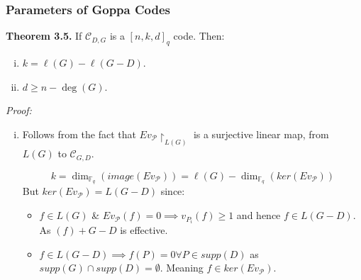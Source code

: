 \documentclass[10pt]{beamer}
\begin{document}
\begin{frame}
  \frametitle{Parameters of Goppa Codes}
  \textbf{Theorem 3.5.} If $\mathcal{C}_{D, G}$ is a $[n, k, d]_q$ code. Then:
  \begin{enumerate}[(i)]
  \pause
    \item $k = \ell(G) - \ell(G - D)$.
  \pause
    \item $d \geq n - \deg(G)$.
  \end{enumerate}
  \pause
  \textit{Proof:}
  \begin{enumerate}[(i)]
    \item Follows from the fact that $Ev_{\mathcal{P}} \restriction_{L(G)}$ is a surjective linear map, from $L(G)$ to $\mathcal{C}_{G, D}$.
      \pause

    \begin{equation*}
      k = \dim_{\mathbb{F}_q}(image(Ev_{\mathcal{P}})) = \ell(G) - \dim_{\mathbb{F}_q}(ker(Ev_{\mathcal{P}}))
    \end{equation*}
    \pause
    But $ker(Ev_{\mathcal{P}}) = L(G - D)$ since:
    \begin{itemize}
    \pause \item $f \in L(G)$ \& $Ev_{\mathcal{P}}(f) = 0 \implies v_{P_i}(f) \geq 1$ and hence $f \in L(G - D)$. As $(f) + G - D$ is effective.
    \pause \item $f \in L(G - D) \implies f(P) = 0 \forall P \in supp(D)$ as $supp(G) \cap supp(D) = \emptyset$. Meaning $f \in ker(Ev_{\mathcal{P}})$.
    \end{itemize}
  \end{enumerate}
\end{frame}
\end{document}
